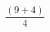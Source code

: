 \documentclass[preview]{standalone}
\begin{document}
\begin{align*}
\dfrac{(9 + 4)}{4}
\end{align*}
\end{document}
